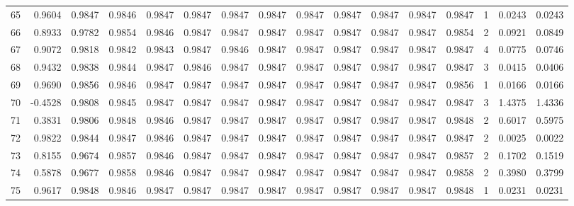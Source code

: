 \begin{tabular}{lrrrrrrrrrrrrrrr}
65  &      0.9604 &  0.9847 &  0.9846 &  0.9847 &  0.9847 &  0.9847 &  0.9847 &  0.9847 &  0.9847 &  0.9847 &   0.9847 &     0.9847 &      1 &                    0.0243 &                     0.0243 \\
66  &      0.8933 &  0.9782 &  0.9854 &  0.9846 &  0.9847 &  0.9847 &  0.9847 &  0.9847 &  0.9847 &  0.9847 &   0.9847 &     0.9854 &      2 &                    0.0921 &                     0.0849 \\
67  &      0.9072 &  0.9818 &  0.9842 &  0.9843 &  0.9847 &  0.9846 &  0.9847 &  0.9847 &  0.9847 &  0.9847 &   0.9847 &     0.9847 &      4 &                    0.0775 &                     0.0746 \\
68  &      0.9432 &  0.9838 &  0.9844 &  0.9847 &  0.9846 &  0.9847 &  0.9847 &  0.9847 &  0.9847 &  0.9847 &   0.9847 &     0.9847 &      3 &                    0.0415 &                     0.0406 \\
69  &      0.9690 &  0.9856 &  0.9846 &  0.9847 &  0.9847 &  0.9847 &  0.9847 &  0.9847 &  0.9847 &  0.9847 &   0.9847 &     0.9856 &      1 &                    0.0166 &                     0.0166 \\
70  &     -0.4528 &  0.9808 &  0.9845 &  0.9847 &  0.9847 &  0.9847 &  0.9847 &  0.9847 &  0.9847 &  0.9847 &   0.9847 &     0.9847 &      3 &                    1.4375 &                     1.4336 \\
71  &      0.3831 &  0.9806 &  0.9848 &  0.9846 &  0.9847 &  0.9847 &  0.9847 &  0.9847 &  0.9847 &  0.9847 &   0.9847 &     0.9848 &      2 &                    0.6017 &                     0.5975 \\
72  &      0.9822 &  0.9844 &  0.9847 &  0.9846 &  0.9847 &  0.9847 &  0.9847 &  0.9847 &  0.9847 &  0.9847 &   0.9847 &     0.9847 &      2 &                    0.0025 &                     0.0022 \\
73  &      0.8155 &  0.9674 &  0.9857 &  0.9846 &  0.9847 &  0.9847 &  0.9847 &  0.9847 &  0.9847 &  0.9847 &   0.9847 &     0.9857 &      2 &                    0.1702 &                     0.1519 \\
74  &      0.5878 &  0.9677 &  0.9858 &  0.9846 &  0.9847 &  0.9847 &  0.9847 &  0.9847 &  0.9847 &  0.9847 &   0.9847 &     0.9858 &      2 &                    0.3980 &                     0.3799 \\
75  &      0.9617 &  0.9848 &  0.9846 &  0.9847 &  0.9847 &  0.9847 &  0.9847 &  0.9847 &  0.9847 &  0.9847 &   0.9847 &     0.9848 &      1 &                    0.0231 &                     0.0231 \\

\end{tabular}
